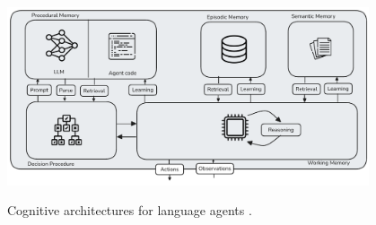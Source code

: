 \begin{figure}
    \centering
    \includegraphics[width=0.95\textwidth]{images/cognitive-arch.pdf}\\[-0.25cm]
    \caption{Cognitive architectures for language agents \cite{sumers2024cognitive}.}
    \label{fig:cognitive-arch}
\end{figure}
